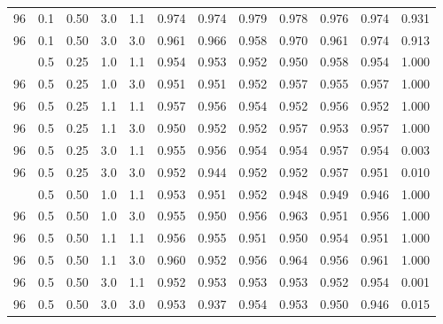 \begin{longtable}[t]{cccccrrrrrrc}
96 & 0.1 & 0.50 & 3.0 & 1.1 & 0.974 & 0.974 & 0.979 & 0.978 & 0.976 & 0.974 & 0.931\\
96 & 0.1 & 0.50 & 3.0 & 3.0 & 0.961 & 0.966 & 0.958 & 0.970 & 0.961 & 0.974 & 0.913\\
\addlinespace
96 & 0.5 & 0.25 & 1.0 & 1.1 & 0.954 & 0.953 & 0.952 & 0.950 & 0.958 & 0.954 & 1.000\\
96 & 0.5 & 0.25 & 1.0 & 3.0 & 0.951 & 0.951 & 0.952 & 0.957 & 0.955 & 0.957 & 1.000\\
96 & 0.5 & 0.25 & 1.1 & 1.1 & 0.957 & 0.956 & 0.954 & 0.952 & 0.956 & 0.952 & 1.000\\
96 & 0.5 & 0.25 & 1.1 & 3.0 & 0.950 & 0.952 & 0.952 & 0.957 & 0.953 & 0.957 & 1.000\\
96 & 0.5 & 0.25 & 3.0 & 1.1 & 0.955 & 0.956 & 0.954 & 0.954 & 0.957 & 0.954 & 0.003\\
96 & 0.5 & 0.25 & 3.0 & 3.0 & 0.952 & 0.944 & 0.952 & 0.952 & 0.957 & 0.951 & 0.010\\
\addlinespace
96 & 0.5 & 0.50 & 1.0 & 1.1 & 0.953 & 0.951 & 0.952 & 0.948 & 0.949 & 0.946 & 1.000\\
96 & 0.5 & 0.50 & 1.0 & 3.0 & 0.955 & 0.950 & 0.956 & 0.963 & 0.951 & 0.956 & 1.000\\
96 & 0.5 & 0.50 & 1.1 & 1.1 & 0.956 & 0.955 & 0.951 & 0.950 & 0.954 & 0.951 & 1.000\\
96 & 0.5 & 0.50 & 1.1 & 3.0 & 0.960 & 0.952 & 0.956 & 0.964 & 0.956 & 0.961 & 1.000\\
96 & 0.5 & 0.50 & 3.0 & 1.1 & 0.952 & 0.953 & 0.953 & 0.953 & 0.952 & 0.954 & 0.001\\
96 & 0.5 & 0.50 & 3.0 & 3.0 & 0.953 & 0.937 & 0.954 & 0.953 & 0.950 & 0.946 & 0.015\\
\bottomrule
\end{longtable}
\endgroup{}

